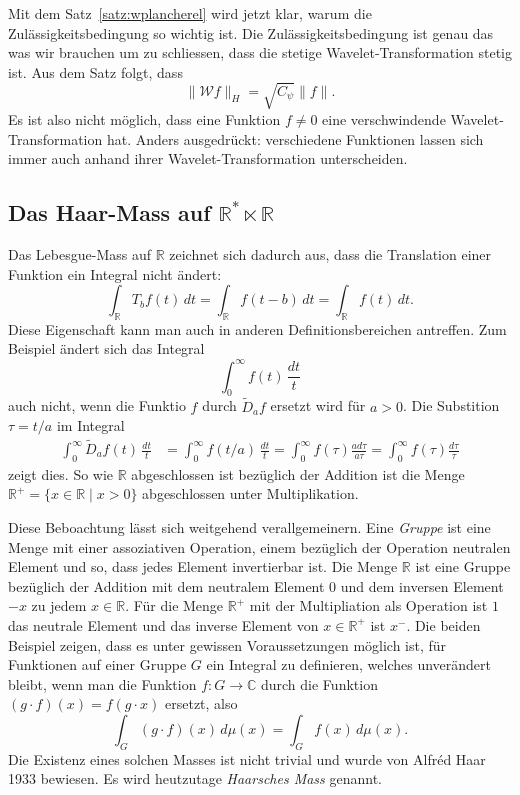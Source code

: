 Mit dem Satz~\ref{satz:wplancherel} wird jetzt klar, warum die
Zulässigkeitsbedingung so wichtig ist.
Die Zulässigkeitsbedingung ist genau das was wir brauchen um zu schliessen,
dass die stetige Wavelet-Transformation stetig ist.
Aus dem Satz folgt, dass
\[
\| \mathcal{W}f \|_H = \sqrt{C_{\psi}}\|f\|.
\]
Es ist also nicht möglich, dass eine Funktion $f\ne 0$ eine verschwindende
Wavelet-Transformation hat.
Anders ausgedrückt: verschiedene Funktionen lassen sich immer auch anhand
ihrer Wavelet-Transformation unterscheiden.

\subsection{Das Haar-Mass auf $\mathbb R^* \ltimes \mathbb R$
\label{subsection:haar-mass}}
Das Lebesgue-Mass auf $\mathbb R$ zeichnet sich dadurch aus, dass
die Translation einer Funktion ein Integral nicht ändert:
\[
\int_{\mathbb R} T_bf(t)\,dt
=
\int_{\mathbb R} f(t-b)\,dt
=
\int_{\mathbb R} f(t)\,dt.
\]
Diese Eigenschaft kann man auch in anderen Definitionsbereichen antreffen.
Zum Beispiel ändert sich das Integral
\[
\int_0^\infty f(t)\,\frac{dt}{t}
\]
auch nicht, wenn die Funktio $f$ durch $\tilde{D}_af$ ersetzt wird
für $a>0$.
Die Substition $\tau = t/a$ im Integral
\begin{align*}
\int_0^\infty \tilde{D}_af(t)\,\frac{dt}{t}
&=
\int_0^\infty f(t/a)\,\frac{dt}{t}
=
\int_0^\infty f(\tau) \frac{a d\tau}{a\tau}
=
\int_0^\infty f(\tau) \frac{d\tau}{\tau}
\end{align*}
zeigt dies.
So wie $\mathbb R$ abgeschlossen ist bezüglich der Addition ist die Menge
$\mathbb R^+=\{x\in\mathbb R\;|\; x > 0\}$ abgeschlossen unter Multiplikation.

Diese Beboachtung lässt sich weitgehend verallgemeinern.
Eine {\em Gruppe} ist eine Menge mit einer assoziativen Operation, einem
bezüglich der Operation neutralen Element und so, dass jedes Element
invertierbar ist.
Die Menge $\mathbb R$ ist eine Gruppe bezüglich der Addition mit dem neutralem
Element $0$ und dem inversen Element $-x$ zu jedem $x\in\mathbb R$.
Für die Menge $\mathbb R^+$ mit der Multipliation als Operation ist
$1$ das neutrale Element und das inverse Element von $x\in\mathbb R^+$
ist $x^{-}$.
Die beiden Beispiel zeigen, dass es unter gewissen Voraussetzungen
möglich ist, für Funktionen auf einer Gruppe $G$ ein Integral zu definieren,
welches unverändert bleibt, wenn man die Funktion $f:G\to \mathbb C$ 
durch die Funktion $(g\cdot f)(x) = f(g\cdot x)$ ersetzt, also
\[
\int_G (g\cdot f)(x)\,d\mu(x)
=
\int_G f(x)\,d\mu(x).
\]
Die Existenz eines solchen Masses ist nicht trivial und wurde
von Alfréd Haar 1933 bewiesen. 
Es wird heutzutage {\em Haarsches Mass} genannt.

